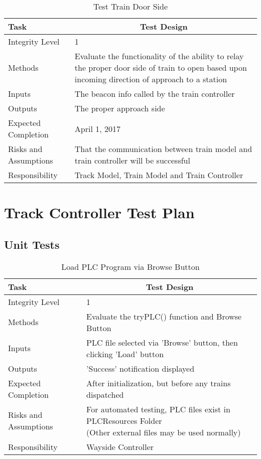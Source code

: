 \documentclass[]{article}
\begin{document}
\begin{table}[H]
	\centering
	\caption{Test Train Door Side}
	\begin{tabular}{|l|l|}
		\hline
		Task & \multicolumn{1}{c|}{Test Design} \\ \hline
		Integrity Level & 1 \\ \hline
		Methods & Evaluate the functionality of the ability to relay the proper door side of train to open based upon incoming direction of approach to a station \\ \hline
		Inputs &  The beacon info called by the train controller \\ \hline
		Outputs &  \parbox[t]{10cm}{The proper approach side}\\ \hline
		Expected Completion & April 1, 2017\\ \hline
		Risks and Assumptions & That the communication between train model and train controller will be successful \\ \hline
		Responsibility & Track Model, Train Model and Train Controller\\ \hline
	\end{tabular}
\end{table}

\section{Track Controller Test Plan}
\subsection{Unit Tests}
\begin{table}[H]
	\centering
	\caption{Load PLC Program via Browse Button}
	\begin{tabular}{|l|l|}
		\hline
		Task & \multicolumn{1}{c|}{Test Design} \\ \hline
		Integrity Level & 1 \\ \hline
		Methods & Evaluate the tryPLC() function and Browse Button\\ \hline
		Inputs &  PLC file selected via 'Browse' button, then clicking 'Load' button \\ \hline
		Outputs &  'Success' notification displayed \\ \hline
		Expected Completion & After initialization, but before any trains dispatched\\ \hline
		Risks and Assumptions & \parbox[t]{10cm}{For automated testing, PLC files exist in PLCResources Folder \\(Other external files may be used normally)}  \\ \hline
		Responsibility & Wayside Controller\\ \hline
	\end{tabular}
\end{table}
\end{document}
